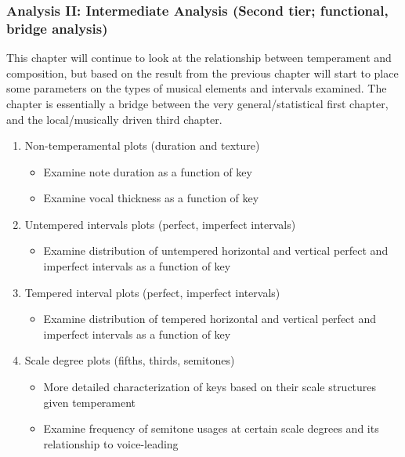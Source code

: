 \subsubsection{Analysis II: Intermediate Analysis (Second tier;
functional, bridge
analysis)}\label{analysis-ii-intermediate-analysis-second-tier-functional-bridge-analysis}

This chapter will continue to look at the relationship between
temperament and composition, but based on the result from the previous
chapter will start to place some parameters on the types of musical
elements and intervals examined. The chapter is essentially a bridge
between the very general/statistical first chapter, and the
local/musically driven third chapter.

\begin{enumerate}
\def\labelenumi{\arabic{enumi}.}
\tightlist
\item
  Non-temperamental plots (duration and texture)

  \begin{itemize}
  \tightlist
  \item
    Examine note duration as a function of key
  \item
    Examine vocal thickness as a function of key
  \end{itemize}
\item
  Untempered intervals plots (perfect, imperfect intervals)

  \begin{itemize}
  \tightlist
  \item
    Examine distribution of untempered horizontal and vertical perfect
    and imperfect intervals as a function of key
  \end{itemize}
\item
  Tempered interval plots (perfect, imperfect intervals)

  \begin{itemize}
  \tightlist
  \item
    Examine distribution of tempered horizontal and vertical perfect and
    imperfect intervals as a function of key
  \end{itemize}
\item
  Scale degree plots (fifths, thirds, semitones)

  \begin{itemize}
  \tightlist
  \item
    More detailed characterization of keys based on their scale
    structures given temperament
  \item
    Examine frequency of semitone usages at certain scale degrees and
    its relationship to voice-leading
  \end{itemize}
\end{enumerate}


